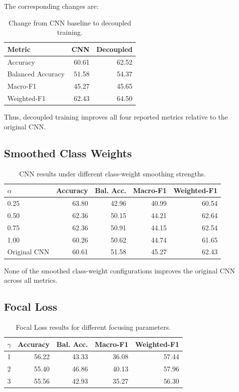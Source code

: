 \documentclass[11pt,a4paper]{article}
\begin{document}
The corresponding changes are:

\begin{table}[H]
\centering
\caption{Change from CNN baseline to decoupled training.}
\label{tab:decoupled_delta}
\begin{tabular}{lrr}
\toprule
Metric & CNN & Decoupled\\
\midrule
Accuracy & 60.61 & 62.52\\
Balanced Accuracy & 51.58 & 54.37\\
Macro-F1 & 45.27 & 45.65\\
Weighted-F1 & 62.43 & 64.50\\
\bottomrule
\end{tabular}
\end{table}

Thus, decoupled training improves all four reported metrics relative to the original CNN.

\subsection{Smoothed Class Weights}

\begin{table}[H]
\centering
\caption{CNN results under different class-weight smoothing strengths.}
\label{tab:smoothed}
\begin{tabular}{lrrrr}
\toprule
$\alpha$ & Accuracy & Bal. Acc. & Macro-F1 & Weighted-F1\\
\midrule
0.25 & 63.80 & 42.96 & 40.99 & 60.54\\
0.50 & 62.36 & 50.15 & 44.21 & 62.64\\
0.75 & 62.36 & 50.91 & 44.15 & 62.54\\
1.00 & 60.26 & 50.62 & 44.74 & 61.65\\
\midrule
Original CNN & 60.61 & 51.58 & 45.27 & 62.43\\
\bottomrule
\end{tabular}
\end{table}

None of the smoothed class-weight configurations improves the original CNN across all metrics.

\subsection{Focal Loss}

\begin{table}[H]
\centering
\caption{Focal Loss results for different focusing parameters.}
\label{tab:focal}
\begin{tabular}{lrrrr}
\toprule
$\gamma$ & Accuracy & Bal. Acc. & Macro-F1 & Weighted-F1\\
\midrule
1 & 56.22 & 43.33 & 36.08 & 57.44\\
2 & 55.40 & 46.86 & 40.13 & 57.96\\
3 & 55.56 & 42.93 & 35.27 & 56.30\\
\bottomrule
\end{tabular}
\end{table}
\end{document}
